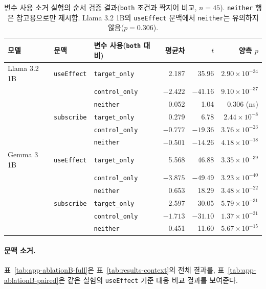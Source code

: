 \begin{table}[t]
  \centering
  \small
  \begin{supertabular}{lllrrr}
    \toprule
    \textbf{모델} & \textbf{문맥} & \textbf{변수 사용(\texttt{both} 대비)} & \textbf{평균차} & \textbf{$t$} & \textbf{양측 $p$} \\
    \midrule
    Llama 3.2 1B & \texttt{useEffect} & \texttt{target\_only} & 2.187 & 35.96 & $2.90\times10^{-34}$ \\
    & & \texttt{control\_only} & $-2.422$ & $-41.16$ & $9.10\times10^{-37}$ \\
    & & \texttt{neither} & 0.052 & 1.04 & 0.306 (ns) \\
    \cmidrule(l){2-6}
    & \texttt{subscribe} & \texttt{target\_only} & 0.279 & 6.78 & $2.44\times10^{-8}$ \\
    & & \texttt{control\_only} & $-0.777$ & $-19.36$ & $3.76\times10^{-23}$ \\
    & & \texttt{neither} & $-0.501$ & $-14.26$ & $4.18\times10^{-18}$ \\
    \midrule
    Gemma 3 1B & \texttt{useEffect} & \texttt{target\_only} & 5.568 & 46.88 & $3.35\times10^{-39}$ \\
    & & \texttt{control\_only} & $-3.875$ & $-49.49$ & $3.23\times10^{-40}$ \\
    & & \texttt{neither} & 0.653 & 18.29 & $3.48\times10^{-22}$ \\
    \cmidrule(l){2-6}
    & \texttt{subscribe} & \texttt{target\_only} & 2.597 & 30.05 & $5.79\times10^{-31}$ \\
    & & \texttt{control\_only} & $-1.713$ & $-31.10$ & $1.37\times10^{-31}$ \\
    & & \texttt{neither} & 0.451 & 11.60 & $5.67\times10^{-15}$ \\
    \bottomrule
  \end{supertabular}
  \caption{변수 사용 소거 실험의 순서 검증 결과(\texttt{both} 조건과 짝지어 비교, $n=45$). \texttt{neither} 행은 참고용으로만 제시함. Llama 3.2 1B의 \texttt{useEffect} 문맥에서 \texttt{neither}는 유의하지 않음($p=0.306$).}
  \label{tab:app-ablationC-ordering}
\end{table}

\paragraph{문맥 소거.}
표~\ref{tab:app-ablationB-full}은 표~\ref{tab:results-context}의 전체 결과를, 표~\ref{tab:app-ablationB-paired}은 같은 실험의 \texttt{useEffect} 기준 대응 비교 결과를 보여준다.

